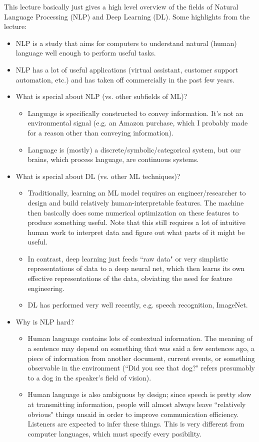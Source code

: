 This lecture basically just gives a high level overview of the fields of Natural Language Processing (NLP) and Deep Learning (DL). Some highlights from the lecture:
\begin{itemize}
\item NLP is a study that aims for computers to understand natural (human) language well enough to perform useful tasks.
\item NLP has a lot of useful applications (virtual assistant, customer support automation, etc.) and has taken off commercially in the past few years.
\item What is special about NLP (vs. other subfields of ML)?
\begin{itemize}
\item Language is specifically constructed to convey information. It's not an environmental signal (e.g. an Amazon purchase, which I probably made for a reason other than conveying information).
\item Language is (mostly) a discrete/symbolic/categorical system, but our brains, which process language, are continuous systems.
\end{itemize}
\item What is special about DL (vs. other ML techniques)?
\begin{itemize}
\item Traditionally, learning an ML model requires an engineer/researcher to design and build relatively human-interpretable features. The machine then basically does some numerical optimization on these features to produce something useful. Note that this still requires a lot of intuitive human work to interpret data and figure out what parts of it might be useful.
\item In contrast, deep learning just feeds ``raw data" or very simplistic representations of data to a deep neural net, which then learns its own effective representations of the data, obviating the need for feature engineering.
\item DL has performed very well recently, e.g. speech recognition, ImageNet.
\end{itemize}
\item Why is NLP hard?
\begin{itemize}
\item Human language contains lots of contextual information. The meaning of a sentence may depend on something that was said a few sentences ago, a piece of information from another document, current events, or something observable in the environment (``Did you see that dog?" refers presumably to a dog in the speaker's field of vision).
\item Human language is also ambiguous by design; since speech is pretty slow at transmitting information, people will almost always leave ``relatively obvious" things unsaid in order to improve communication efficiency. Listeners are expected to infer these things. This is very different from computer languages, which must specify every posibility.
\end{itemize}
\end{itemize}
